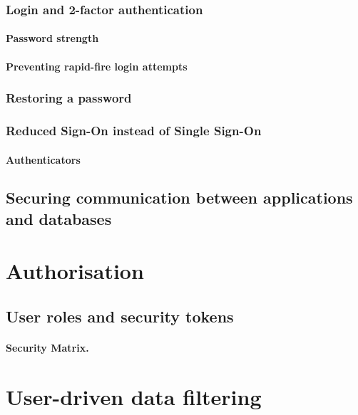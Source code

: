 \documentclass[a4paper,12pt,oneside,openright]{memoir}
\begin{document}
\subsubsection*{Login and 2-factor authentication}

\paragraph*{Password strength}

\paragraph*{Preventing rapid-fire login attempts}

\subsubsection*{Restoring a password}


\subsubsection*{Reduced Sign-On instead of Single Sign-On}

\paragraph*{Authenticators}


\subsection*{Securing communication between applications and databases}


\section*{Authorisation}\label{sec:03}

\subsection*{User roles and security tokens}

\paragraph{Security Matrix.}

\section*{User-driven data filtering}
\end{document}
